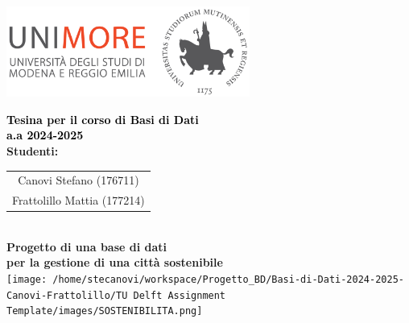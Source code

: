 \begin{titlepage}
\begin{center}
    \includegraphics[width=0.6\textwidth]{images/Logo_C_Positivo_Colore.png}

    \vspace*{2cm}  %

    {\Huge \textbf{\textcolor{black}{Tesina per il corso di Basi di Dati \\ a.a 2024-2025 }}}\\[1.5cm]
    {\Large \textbf{\textcolor{tudelftdarkblue}{Studenti:}}}\\[0.5cm]
    \begin{tabular}{c}
        \Large \textcolor{tudelftdarkblue}{Canovi Stefano (176711)} \\ 
        \Large \textcolor{tudelftdarkblue}{Frattolillo Mattia (177214)} \\ 
    \end{tabular}\\[2cm]
    
    \vspace*{1cm}
    {\Large \textbf{\textcolor{tudelftdarkblue}{Progetto di una base di dati\\ per la gestione di una città sostenibile }}}\\[1.3cm]
    \texttt{[image: /home/stecanovi/workspace/Progetto\_BD/Basi-di-Dati-2024-2025-Canovi-Frattolillo/TU Delft Assignment Template/images/SOSTENIBILITA.png]}

    \end{center}  %
\end{titlepage}